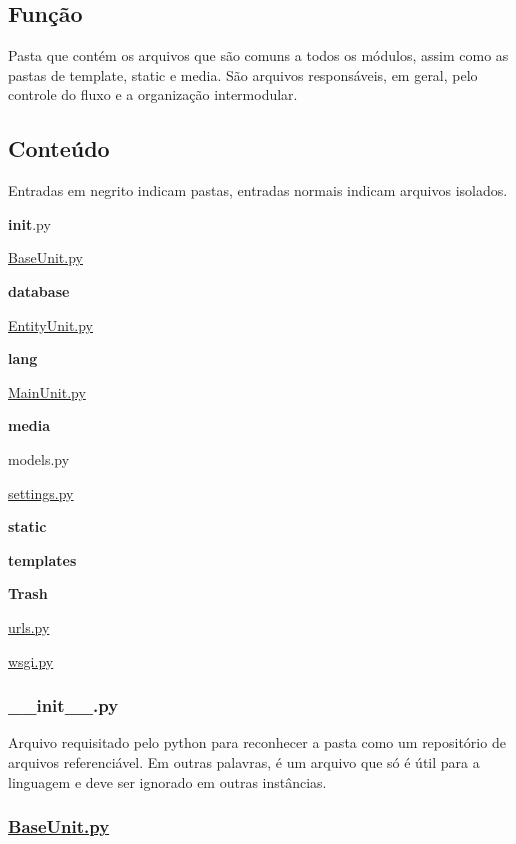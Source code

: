 \subsection*{Função}

Pasta que contém os arquivos que são comuns a todos os módulos, assim como as pastas de template, static e media. São arquivos responsáveis, em geral, pelo controle do fluxo e a organização intermodular.

\subsection*{Conteúdo}

Entradas em negrito indicam pastas, entradas normais indicam arquivos isolados.


\begin{DoxyItemize}
\item {\bfseries init}.py
\item \hyperlink{BaseUnit_8py}{Base\-Unit.\-py}
\item {\bfseries database}
\item \hyperlink{EntityUnit_8py}{Entity\-Unit.\-py}
\item {\bfseries lang}
\item \hyperlink{MainUnit_8py}{Main\-Unit.\-py}
\item {\bfseries media}
\item models.\-py
\item \hyperlink{settings_8py}{settings.\-py}
\item {\bfseries static}
\item {\bfseries templates}
\item {\bfseries Trash}
\item \hyperlink{urls_8py}{urls.\-py}
\item \hyperlink{wsgi_8py}{wsgi.\-py}
\end{DoxyItemize}

\subsubsection*{\-\_\-\-\_\-init\-\_\-\-\_\-.\-py}

Arquivo requisitado pelo python para reconhecer a pasta como um repositório de arquivos referenciável. Em outras palavras, é um arquivo que só é útil para a linguagem e deve ser ignorado em outras instâncias.

\subsubsection*{\hyperlink{BaseUnit_8py}{Base\-Unit.\-py}}

